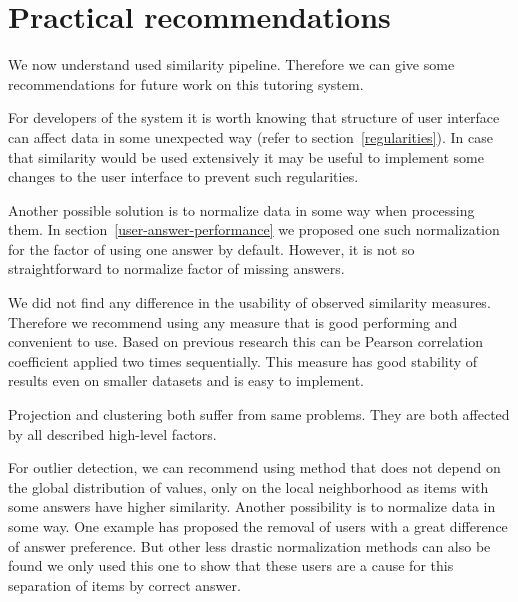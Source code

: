 \documentclass[
  printed, %
  table,   %
  nolof,     %
  nolot,     %
  color,
  final,
  nocover
]{fithesis3}
\begin{document}
\section{Practical recommendations}\label{practical-recommendations}

We now understand used similarity pipeline. Therefore we can give some recommendations for future work on this tutoring system.


For developers of the system it is worth knowing that structure of user interface can affect data in some unexpected way (refer to section~\ref{regularities}). In case that similarity would be used extensively it may be useful to implement some changes to the user interface to prevent such regularities.


Another possible solution is to normalize data in some way when processing them. In section~\ref{user-answer-performance} we proposed one such normalization for the factor of using one answer by default. However, it is not so straightforward to normalize factor of missing answers.


We did not find any difference in the usability of observed similarity measures. Therefore we recommend using any measure that is good performing and convenient to use. Based on previous research this can be Pearson correlation coefficient applied two times sequentially. This measure has good stability of results even on smaller datasets and is easy to implement.


Projection and clustering both suffer from same problems. They are both affected by all described high-level factors.


For outlier detection, we can recommend using method that does not depend on the global distribution of values, only on the local neighborhood as items with some answers have higher similarity. Another possibility is to normalize data in some way. One example has proposed the removal of users with a great difference of answer preference. But other less drastic normalization methods can also be found we only used this one to show that these users are a cause for this separation of items by correct answer.

\end{document}
